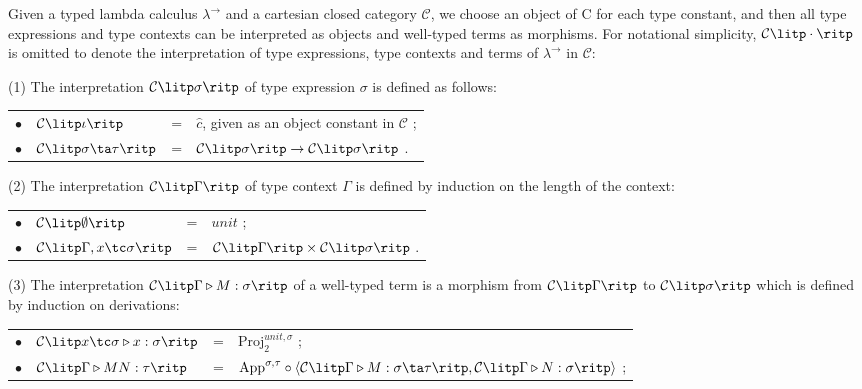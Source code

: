 \begin{definition}
\label{definition:inter_terms}
Given a typed lambda calculus $ \lambda ^ \to $ and a cartesian closed category $ \mathcal{C} $, we choose an object of C for each type constant, and then all type expressions and type contexts can be interpreted as objects and well-typed terms as morphisms. For notational simplicity, $ \mathcal{C} \litp \cdot \ritp $ is omitted to denote the interpretation of type expressions, type contexts and terms of $ \lambda ^ \to $ in $ \mathcal{C} $:
\begin{myitemize}
\item[(1)] The interpretation $ \mathcal{C} \litp \sigma \ritp $ of type expression $ \sigma $ is defined as follows: \\[5pt]
  \begin{tabular}{rlcl}
  $ \bullet $ & $ \mathcal{C} \litp \iota \ritp $ & = & $ \hat{c} $, given as an object constant in $ \mathcal{C} $ ; \\[5pt]
  $ \bullet $ & $ \mathcal{C} \litp \sigma \ta \tau \ritp $ & = & $ \mathcal{C} \litp \sigma \ritp \to \mathcal{C} \litp \sigma \ritp $ . \\[5pt]
  \end{tabular}
\item[(2)] The interpretation $ \mathcal{C} \litp \Gamma \ritp $ of type context $ \Gamma $ is defined by induction on the length of the context: \\[5pt]
  \begin{tabular}{rlcl}
  $ \bullet $ & $ \mathcal{C} \litp \emptyset \ritp $ & = & $ unit $ ; \\[5pt]
  $ \bullet $ & $ \mathcal{C} \litp \Gamma , x \tc \sigma \ritp $ & = & $ \mathcal{C} \litp \Gamma \ritp \times \mathcal{C} \litp \sigma \ritp $ . \\[5pt]
  \end{tabular}
\item[(3)] The interpretation $ \mathcal{C} \litp \Gamma \triangleright M: \sigma \ritp $ of a well-typed term is a morphism from $ \mathcal{C} \litp \Gamma \ritp $ to $ \mathcal{C} \litp \sigma \ritp $ which is defined by induction on derivations: \\[5pt]
  \begin{tabular}{rlcl}
  $ \bullet $ & $ \mathcal{C} \litp x \tc \sigma \triangleright x: \sigma \ritp $ & = & $ \text{Proj}_2^{unit, \sigma} $ ; \\[5pt]
  $ \bullet $ & $ \mathcal{C} \litp \Gamma \triangleright MN: \tau \ritp $ & = & $ \text{App}^{\sigma,\tau} \circ \langle \mathcal{C} \litp \Gamma \triangleright M: \sigma \ta \tau \ritp , \mathcal{C} \litp \Gamma \triangleright N: \sigma \ritp \rangle $ ; \\[5pt]

\end{tabular}
\end{myitemize}
\end{definition}
